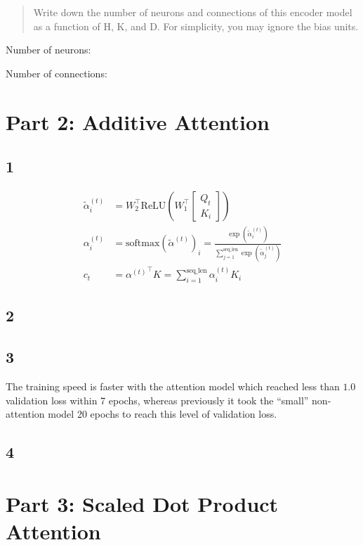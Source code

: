 \documentclass{article}
\begin{document}
\begin{quote}
Write down the number of neurons and connections of this encoder model as a function of H, K, and D.  For simplicity, you may ignore the bias units.
\end{quote}

Number of neurons: 

Number of connections: 



\section*{Part 2: Additive Attention}

\subsection*{1}

\begin{align*}
\tilde{\alpha}^{(t)}_i &= W_2^\intercal \textrm{ReLU} ( W_1^\intercal 
\begin{bmatrix}
Q_t \\ K_i
\end{bmatrix} 
)
\\
\alpha^{(t)}_i &= \textrm{softmax}(\tilde{\alpha}^{(t)})_i = \frac
{\exp(\tilde{\alpha}^{(t)}_i)}
{\sum_{j=1}^{\textrm{seq\_len}} \exp(\tilde{\alpha}^{(t)}_j) }
\\
c_t &= {\alpha^{(t)}}^\intercal K = \sum_{i=1}^{\textrm{seq\_len}} \alpha^{(t)}_i K_i
\end{align*}

\subsection*{2}

\subsection*{3}
The training speed is faster with the attention model which reached less than $1.0$ validation loss within 7 epochs, whereas previously it took the ``small'' non-attention model 20 epochs to reach this level of validation loss.

\subsection*{4}




\section*{Part 3: Scaled Dot Product Attention}
\end{document}
